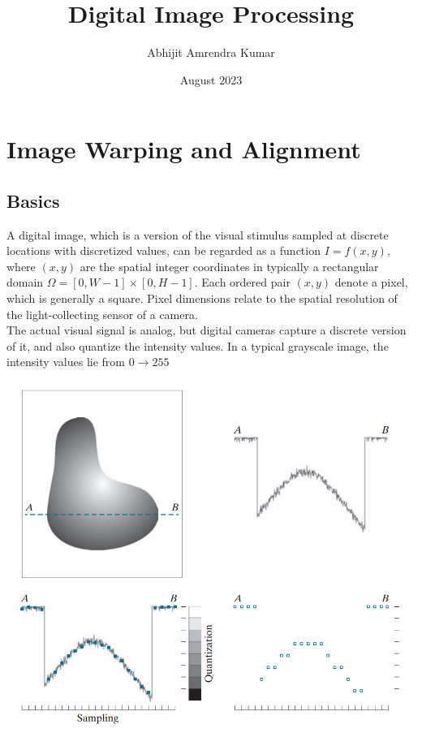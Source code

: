 \documentclass{report}
\title{Digital Image Processing}
\author{Abhijit Amrendra Kumar}
\date{August 2023}
\begin{document}
\maketitle

\chapter{Image Warping and Alignment}
\section{Basics}

A digital image, which is a version of the visual stimulus sampled at discrete locations with discretized values, can be regarded as a function $I = f(x,y)$, where $(x,y)$ are the spatial integer coordinates in typically a rectangular domain $\Omega = [0,W-1]\times[0,H-1]$. Each ordered pair $(x,y)$ denote a pixel, which is generally a square. Pixel dimensions relate to the spatial resolution of the light-collecting sensor of a camera. \\

The actual visual signal is analog, but digital cameras capture a discrete version of it, and also quantize the intensity values. In a typical grayscale image, the intensity values lie from $0\rightarrow 255$

\begin{center}
  \includegraphics[scale=0.5]{"images/01.png"}
\end{center}
\end{document}
